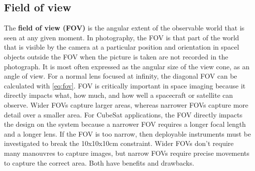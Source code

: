 \subsection{Field of view}
The \textbf{field of view (FOV)} is the angular extent of the observable world that is seen at any given moment. In photography, the FOV is that part of the world that is visible by the camera at a particular position and orientation in spacel objects outside the FOV when the picture is taken are not recorded in the photograph. It is most often expressed as the angular size of the view cone, as an angle of view. For a normal lens focused at infinity, the diagonal FOV can be calculated with \ref{eq:fov}.
\nl
FOV is critically important in space imaging because it directly impacts what, how much, and how well a spacecraft or satellite can observe. Wider FOVs capture larger areas, whereas narrower FOVs capture more detail over a smaller area. For CubeSat applications, the FOV directly impacts the design on the system because a narrower FOV requires a longer focal length and a longer lens. If the FOV is too narrow, then deployable instruments must be investigated to break the 10x10x10cm constraint.
Wider FOVs don't require many manouvres to capture images, but narrow FOVs require precise movements to capture the correct area. Both have benefits and drawbacks.

